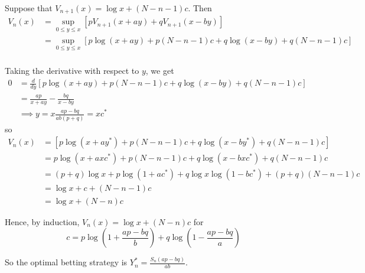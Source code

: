 \documentclass[12pt]{article}
\begin{document}
        Suppose that $V_{n+1}(x) = \log x + (N - n - 1)c$. Then
        \begin{align*}
            V_n(x) &= \sup_{0 \leq y \leq x} [pV_{n+1}(x + ay) + qV_{n+1}(x - by)]\\ 
                &= \sup_{0 \leq y \leq x} [p\log(x + ay) + p(N - n - 1)c + q\log(x - by) + q(N - n - 1)c]\\
        \end{align*}

        Taking the derivative with respect to $y$, we get
        \begin{align*}
            0 &= \frac{d}{dy} [p\log(x + ay) + p(N - n - 1)c + q\log(x - by) + q(N - n - 1)c]\\ 
            &= \frac{ap}{x + ay} - \frac{bq}{x - by}\\ 
            &\implies y = x\frac{ap - bq}{ab(p+q)} = xc^*
        \end{align*}
        so 
        \begin{align*}
            V_n(x) &= [p\log(x + ay^*) + p(N - n - 1)c + q\log(x - by^*) + q(N - n - 1)c]\\ 
                &= p\log(x + axc^*) + p(N - n - 1)c + q\log(x - bxc^*) + q(N - n - 1)c\\
                &= (p + q)\log x + p\log(1 + ac^*) + q\log x \log(1 - bc^*) + (p + q)(N - n - 1)c\\
                &= \log x + c + (N - n - 1)c\\
                &= \log x + (N - n)c
        \end{align*} 

        Hence, by induction, $V_n(x) = \log x + (N - n)c$ for 
        \[c = p\log(1 + \frac{ap - bq}{b}) + q\log(1 - \frac{ap - bq}{a})\] 
        
        So the optimal betting strategy is $Y_n^* = \frac{S_n(ap - bq)}{ab}$.
       
    \color{black}
\end{document}
